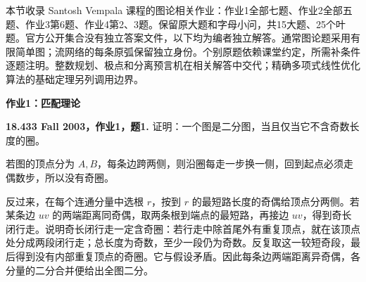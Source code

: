 本节收录 Santosh Vempala 课程的图论相关作业：作业1全部七题、作业2全部五题、作业3第6题、作业4第2、3题。保留原大题和字母小问，共15大题、25个叶题。官方公开集合没有独立答案文件，以下均为编者独立解答。通常图论题采用有限简单图；流网络的每条原弧保留独立身份。个别原题依赖课堂约定，所需补条件逐题注明。整数规划、极点和分离预言机在相关解答中交代；精确多项式线性优化算法的基础定理另列调用边界。

\par\addvspace{7pt}\noindent\textbf{作业1：匹配理论}

\begin{exercise}\label{mit:18433-a1-q1}
\textbf{18.433 Fall 2003，作业1，题1.}
证明：一个图是二分图，当且仅当它不含奇数长度的圈。
\end{exercise}
\begin{solution}
若图的顶点分为 $A,B$，每条边跨两侧，则沿圈每走一步换一侧，回到起点必须走偶数步，所以没有奇圈。

反过来，在每个连通分量中选根 $r$，按到 $r$ 的最短路长度的奇偶给顶点分两侧。若某条边 $uv$ 的两端距离同奇偶，取两条根到端点的最短路，再接边 $uv$，得到奇长闭行走。说明奇长闭行走一定含奇圈：若行走中除首尾外有重复顶点，就在该顶点处分成两段闭行走；总长度为奇数，至少一段仍为奇数。反复取这一较短奇段，最后得到没有内部重复顶点的奇圈。它与假设矛盾。因此每条边两端距离异奇偶，各分量的二分合并便给出全图二分。
\end{solution}

